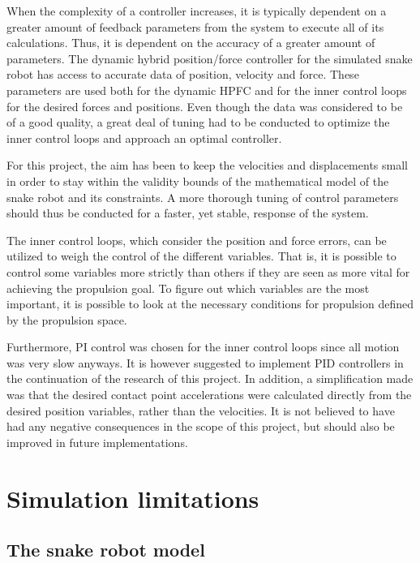 When the complexity of a controller increases, it is typically dependent on a greater amount of feedback parameters from the system to execute all of its calculations. Thus, it is dependent on the accuracy of a greater amount of parameters. The dynamic hybrid position/force controller for the simulated snake robot has access to accurate data of position, velocity and force. These parameters are used both for the dynamic HPFC and for the inner control loops for the desired forces and positions. Even though the data was considered to be of a good quality, a great deal of tuning had to be conducted to optimize the inner control loops and approach an optimal controller. 

For this project, the aim has been to keep the velocities and displacements small in order to stay within the validity bounds of the mathematical model of the snake robot and its constraints. A more thorough tuning of control parameters should thus be conducted for a faster, yet stable, response of the system.

The inner control loops, which consider the position and force errors, can be utilized to weigh the control of the different variables. That is, it is possible to control some variables more strictly than others if they are seen as more vital for achieving the propulsion goal. To figure out which variables are the most important, it is possible to look at the necessary conditions for propulsion defined by the propulsion space.

Furthermore, PI control was chosen for the inner control loops since all motion was very slow anyways. It is however suggested to implement PID controllers in the continuation of the research of this project. In addition, a simplification made was that the desired contact point accelerations were calculated directly from the desired position variables, rather than the velocities. It is not believed to have had any negative consequences in the scope of this project, but should also be improved in future implementations.



\section{Simulation limitations}

\subsection{The snake robot model}

